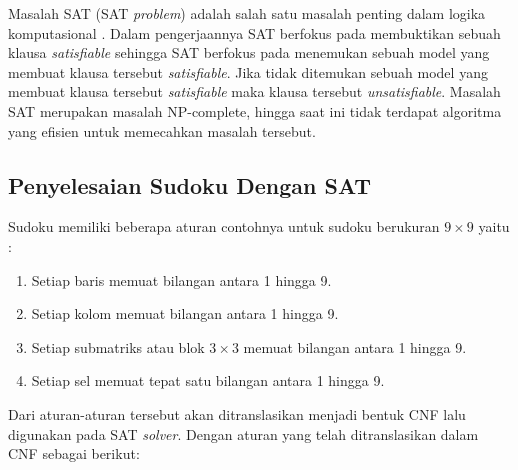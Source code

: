 Masalah SAT (SAT \textit{problem}) adalah salah satu masalah penting dalam logika komputasional \cite{huth2004logic}. Dalam pengerjaannya SAT berfokus pada membuktikan sebuah klausa \textit{satisfiable} sehingga SAT berfokus pada menemukan sebuah model yang membuat klausa tersebut \textit{satisfiable}. Jika tidak ditemukan sebuah model yang membuat klausa tersebut \textit{satisfiable} maka klausa tersebut \textit{unsatisfiable}. Masalah SAT merupakan masalah NP-complete, hingga saat ini tidak
terdapat algoritma yang efisien untuk memecahkan masalah tersebut. 

\subsection{Penyelesaian Sudoku Dengan SAT}
Sudoku memiliki beberapa aturan contohnya untuk sudoku berukuran  $9 \times 9$ yaitu :

\begin{enumerate}
	\item Setiap baris memuat bilangan antara 1 hingga 9.
	\item Setiap kolom memuat bilangan antara 1 hingga 9.
	\item Setiap submatriks atau blok $3 \times 3$
	 memuat bilangan antara 1 hingga 9.
	\item Setiap sel memuat tepat satu bilangan antara 1 hingga 9.
\end{enumerate}

Dari aturan-aturan tersebut akan ditranslasikan menjadi bentuk CNF lalu digunakan pada SAT \textit{solver}. Dengan aturan yang telah ditranslasikan dalam CNF sebagai berikut:

